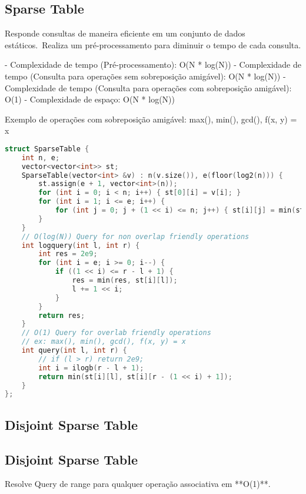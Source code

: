 \documentclass[11pt, a4paper, twoside]{article}
\begin{document}
\subsection{Sparse Table}



Responde consultas de maneira eficiente em um conjunto de dados estáticos.\
Realiza um pré-processamento para diminuir o tempo de cada consulta.

- Complexidade de tempo (Pré-processamento): O(N * log(N))
- Complexidade de tempo (Consulta para operações sem sobreposição amigável): O(N * log(N))
- Complexidade de tempo (Consulta para operações com sobreposição amigável): O(1)
- Complexidade de espaço: O(N * log(N))

Exemplo de operações com sobreposição amigável: max(), min(), gcd(), f(x, y) = x



\begin{lstlisting}[language=C++]
struct SparseTable {
    int n, e;
    vector<vector<int>> st;
    SparseTable(vector<int> &v) : n(v.size()), e(floor(log2(n))) {
        st.assign(e + 1, vector<int>(n));
        for (int i = 0; i < n; i++) { st[0][i] = v[i]; }
        for (int i = 1; i <= e; i++) {
            for (int j = 0; j + (1 << i) <= n; j++) { st[i][j] = min(st[i - 1][j], st[i - 1][j + (1 << (i - 1))]); }
        }
    }
    // O(log(N)) Query for non overlap friendly operations
    int logquery(int l, int r) {
        int res = 2e9;
        for (int i = e; i >= 0; i--) {
            if ((1 << i) <= r - l + 1) {
                res = min(res, st[i][l]);
                l += 1 << i;
            }
        }
        return res;
    }
    // O(1) Query for overlab friendly operations
    // ex: max(), min(), gcd(), f(x, y) = x
    int query(int l, int r) {
        // if (l > r) return 2e9;
        int i = ilogb(r - l + 1);
        return min(st[i][l], st[i][r - (1 << i) + 1]);
    }
};
\end{lstlisting}

\subsection{Disjoint Sparse Table}

\subsection{Disjoint Sparse Table}



Resolve Query de range para qualquer operação associativa em **O(1)**.
\end{document}
